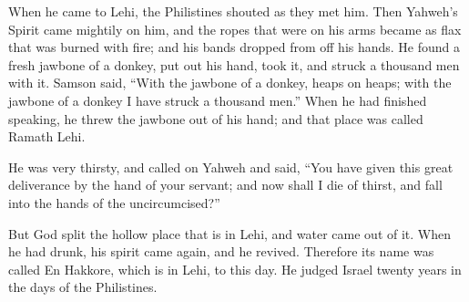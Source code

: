 {\par }{\PP {}When he came to Lehi, the Philistines shouted as they met him. Then Yahweh’s Spirit came mightily on him, and the ropes that were on his arms became as flax that was burned with fire; and his bands dropped from off his hands.
He found a fresh jawbone of a donkey, put out his hand, took it, and struck a thousand men with it.
Samson said, “With the jawbone of a donkey, heaps on heaps; with the jawbone of a donkey I have struck a thousand men.”
When he had finished speaking, he threw the jawbone out of his hand; and that place was called Ramath Lehi.
\par }{\PP {}He was very thirsty, and called on Yahweh and said, “You have given this great deliverance by the hand of your servant; and now shall I die of thirst, and fall into the hands of the uncircumcised?”
\par }{\PP {}But God split the hollow place that is in Lehi, and water came out of it. When he had drunk, his spirit came again, and he revived. Therefore its name was called En Hakkore, which is in Lehi, to this day.
He judged Israel twenty years in the days of the Philistines.

}

